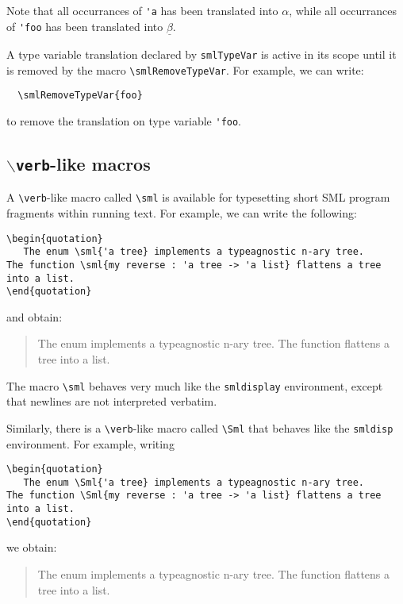 Note that all occurrances of \verb|'a| has been translated into
$\alpha$, while all occurrances of \verb|'foo| has been translated
into $\underline\beta$.

A type variable translation declared by \verb|smlTypeVar| is active
in its scope until it is removed by 
the macro \verb|\smlRemoveTypeVar|.
For example, we can write:
\begin{verbatim}
  \smlRemoveTypeVar{foo}
\end{verbatim}
to remove the translation on type variable \verb|'foo|.


\subsection{{\tt $\backslash${verb}}-like macros}
A \verb|\verb|-like macro called \verb|\sml| is available for typesetting
short SML program fragments within running text.  
For example, we can write the following:
\begin{verbatim}
\begin{quotation}
   The enum \sml{'a tree} implements a typeagnostic n-ary tree.
The function \sml{my reverse : 'a tree -> 'a list} flattens a tree into a list.
\end{quotation}
\end{verbatim}
and obtain:
\begin{quotation}
   The enum  implements a typeagnostic n-ary tree.
The function  flattens a tree into a list.
\end{quotation}
The macro \verb|\sml| behaves very much like the \verb|smldisplay|
environment, except that newlines are not interpreted verbatim.

Similarly, there is a \verb|\verb|-like macro called \verb|\Sml| that
behaves like the \verb|smldisp| environment.  For example, writing
\begin{verbatim}
\begin{quotation}
   The enum \Sml{'a tree} implements a typeagnostic n-ary tree.
The function \Sml{my reverse : 'a tree -> 'a list} flattens a tree into a list.
\end{quotation}
\end{verbatim}
we obtain:
\begin{quotation}
   The enum  implements a typeagnostic n-ary tree.
The function  flattens a tree into a list.
\end{quotation}

